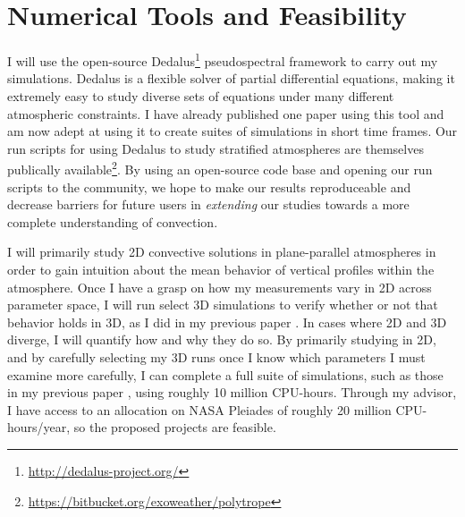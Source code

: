 \documentclass[aasms,12pt]{article}
\begin{document}
\vspace{-0.2cm}
\section{Numerical Tools and Feasibility}
\vspace{-0.2cm}
I will use the open-source Dedalus\footnote{\url{http://dedalus-project.org/}} pseudospectral framework 
\citep{burns&all2016} to carry out my simulations.  
Dedalus is a flexible solver of partial differential equations,
making it extremely easy to study diverse sets of equations under many different atmospheric
constraints.  I have already published one paper using this tool \citep{anders&brown2017}
and am now adept at using it to create suites of simulations
in short time frames. Our run scripts for using Dedalus to study stratified atmospheres
are themselves publically available\footnote{\url{https://bitbucket.org/exoweather/polytrope}}.
By using an open-source code base and opening our run scripts to the community, we hope to
make our results reproduceable and decrease barriers for future users in 
\emph{extending} our studies towards a more complete understanding of convection.


I will primarily study 2D convective solutions in plane-parallel atmospheres in order to gain
intuition about the mean behavior of vertical profiles within the atmosphere.  Once I have a grasp
on how my measurements vary in 2D across parameter space, I will run select 3D simulations to
verify whether or not that behavior holds in 3D, as I did in my previous paper \citep{anders&brown2017}.
In cases where 2D and 3D diverge, I will quantify how and why they do so.
By primarily studying in 2D, and by carefully
selecting my 3D runs once I know which parameters I must examine more carefully, I can complete
a full suite of simulations, such as those in my previous paper \citep{anders&brown2017}, using
roughly 10 million CPU-hours.  Through my advisor, I have access to an allocation on NASA Pleiades
of roughly 20 million CPU-hours/year, so the proposed projects are feasible.




\vspace{-0.2cm}
\end{document}
